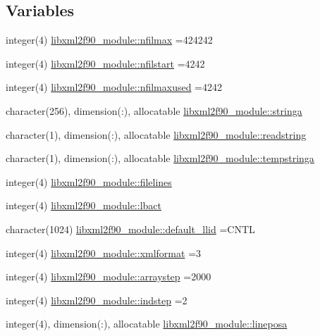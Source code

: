 \subsection*{Variables}
\begin{DoxyCompactItemize}
\item 
integer(4) \hyperlink{namespacelibxml2f90__module_ae803c4d10ecfbdc0b6624c004764524e}{libxml2f90\+\_\+module\+::nfilmax} =424242
\item 
integer(4) \hyperlink{namespacelibxml2f90__module_a76bbe7c27297a807f15421a654d7ca6b}{libxml2f90\+\_\+module\+::nfilstart} =4242
\item 
integer(4) \hyperlink{namespacelibxml2f90__module_a217fb75c146107a9cf2983b658274832}{libxml2f90\+\_\+module\+::nfilmaxused} =4242
\item 
character(256), dimension(\+:), allocatable \hyperlink{namespacelibxml2f90__module_ab661dc207b668f91bdee9a3efea3dd49}{libxml2f90\+\_\+module\+::stringa}
\item 
character(1), dimension(\+:), allocatable \hyperlink{namespacelibxml2f90__module_a791c6344181b9375ed7fc4470f4554aa}{libxml2f90\+\_\+module\+::readstring}
\item 
character(1), dimension(\+:), allocatable \hyperlink{namespacelibxml2f90__module_a55e059defbab12f54d54b8f44ad84777}{libxml2f90\+\_\+module\+::tempstringa}
\item 
integer(4) \hyperlink{namespacelibxml2f90__module_a63c8792c8a009d1875c66340984b0879}{libxml2f90\+\_\+module\+::filelines}
\item 
integer(4) \hyperlink{namespacelibxml2f90__module_a958e698155df02283f763fc986f1785f}{libxml2f90\+\_\+module\+::lbact}
\item 
character(1024) \hyperlink{namespacelibxml2f90__module_a2dc8e61fe0a8b9c60b5197984e7b30ae}{libxml2f90\+\_\+module\+::default\+\_\+llid} =\textquotesingle{}C\+N\+TL\textquotesingle{}
\item 
integer(4) \hyperlink{namespacelibxml2f90__module_a6e7d9498a3938eb57c8ff2020118098e}{libxml2f90\+\_\+module\+::xmlformat} =3
\item 
integer(4) \hyperlink{namespacelibxml2f90__module_a03a53e403791ec1e112a71f5f2831522}{libxml2f90\+\_\+module\+::arraystep} =2000
\item 
integer(4) \hyperlink{namespacelibxml2f90__module_aef9ff21f71177c723fbac94eeafcb733}{libxml2f90\+\_\+module\+::indstep} =2
\item 
integer(4), dimension(\+:), allocatable \hyperlink{namespacelibxml2f90__module_ad86b3bf7c2ae6ea6856befb154df888f}{libxml2f90\+\_\+module\+::lineposa}

\end{DoxyCompactItemize}
